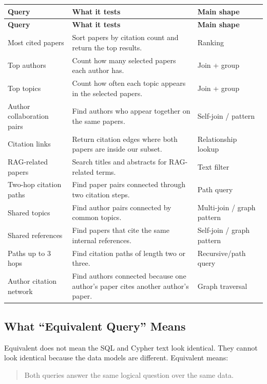 \documentclass[11pt]{article}
\begin{document}
\begin{longtable}{|p{}|p{}|p{}|}
\hline
\textbf{Query} & \textbf{What it tests} & \textbf{Main shape} \\
\hline
\endfirsthead
\hline
\textbf{Query} & \textbf{What it tests} & \textbf{Main shape} \\
\hline
\endhead
Most cited papers & Sort papers by citation count and return the top results. & Ranking \\
\hline
Top authors & Count how many selected papers each author has. & Join + group \\
\hline
Top topics & Count how often each topic appears in the selected papers. & Join + group \\
\hline
Author collaboration pairs & Find authors who appear together on the same papers. & Self-join / pattern \\
\hline
Citation links & Return citation edges where both papers are inside our subset. & Relationship lookup \\
\hline
RAG-related papers & Search titles and abstracts for RAG-related terms. & Text filter \\
\hline
Two-hop citation paths & Find paper pairs connected through two citation steps. & Path query \\
\hline
Shared topics & Find author pairs connected by common topics. & Multi-join / graph pattern \\
\hline
Shared references & Find papers that cite the same internal references. & Self-join / graph pattern \\
\hline
Paths up to 3 hops & Find citation paths of length two or three. & Recursive/path query \\
\hline
Author citation network & Find authors connected because one author's paper cites another author's paper. & Graph traversal \\
\hline
\end{longtable}

\subsection{What ``Equivalent Query'' Means}

Equivalent does not mean the SQL and Cypher text look identical.
They cannot look identical because the data models are different.
Equivalent means:

\begin{quote}
Both queries answer the same logical question over the same data.
\end{quote}
\end{document}
